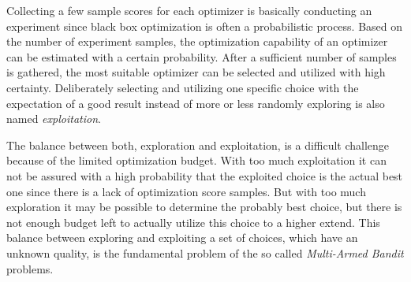 Collecting a few sample scores for each optimizer is basically conducting an experiment since black box optimization is often a probabilistic process.
Based on the number of experiment samples, the optimization capability of an optimizer can be estimated with a certain probability.
After a sufficient number of samples is gathered, the most suitable optimizer can be selected and utilized with high certainty.
Deliberately selecting and utilizing one specific choice with the expectation of a good result instead of more or less randomly exploring is also named \textit{exploitation}.

The balance between both, exploration and exploitation, is a difficult challenge because of the limited optimization budget.
With too much exploitation it can not be assured with a high probability that the exploited choice is the actual best one since there is a lack of optimization score samples.
But with too much exploration it may be possible to determine the probably best choice, but there is not enough budget left to actually utilize this choice to a higher extend.
This balance between exploring and exploiting a set of choices, which have an unknown quality, is the fundamental problem of the so called \textit{Multi-Armed Bandit} problems.

